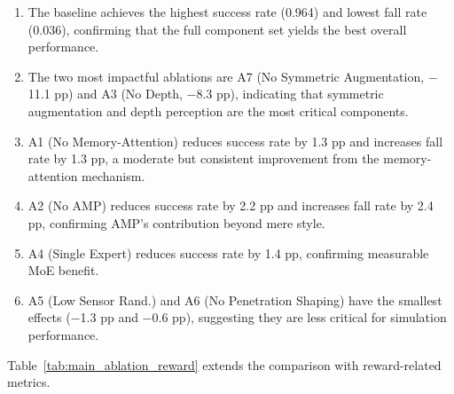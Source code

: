 \begin{enumerate}
    \item The baseline achieves the highest success rate (0.964) and lowest fall rate (0.036), confirming that the full component set yields the best overall performance.
    \item The two most impactful ablations are A7 (No Symmetric Augmentation, $-$11.1 pp) and A3 (No Depth, $-$8.3 pp), indicating that symmetric augmentation and depth perception are the most critical components.
    \item A1 (No Memory-Attention) reduces success rate by 1.3 pp and increases fall rate by 1.3 pp, a moderate but consistent improvement from the memory-attention mechanism.
    \item A2 (No AMP) reduces success rate by 2.2 pp and increases fall rate by 2.4 pp, confirming AMP's contribution beyond mere style.
    \item A4 (Single Expert) reduces success rate by 1.4 pp, confirming measurable MoE benefit.
    \item A5 (Low Sensor Rand.) and A6 (No Penetration Shaping) have the smallest effects ($-$1.3 pp and $-$0.6 pp), suggesting they are less critical for simulation performance.
\end{enumerate}

Table~\ref{tab:main_ablation_reward} extends the comparison with reward-related metrics.

